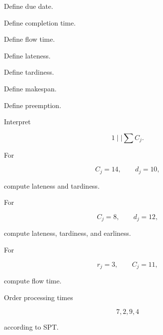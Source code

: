 \begin{exercise}[1]
Define due date.
\end{exercise}

\begin{exercise}[1]
Define completion time.
\end{exercise}

\begin{exercise}[1]
Define flow time.
\end{exercise}

\begin{exercise}[1]
Define lateness.
\end{exercise}

\begin{exercise}[1]
Define tardiness.
\end{exercise}

\begin{exercise}[1]
Define makespan.
\end{exercise}

\begin{exercise}[1]
Define preemption.
\end{exercise}

\begin{exercise}[1]
Interpret

\[
1\mid\mid\sum C_j.
\]
\end{exercise}

\begin{exercise}[2]
For

\[
C_j=14,
\qquad
d_j=10,
\]

compute lateness and tardiness.
\end{exercise}

\begin{exercise}[2]
For

\[
C_j=8,
\qquad
d_j=12,
\]

compute lateness, tardiness, and earliness.
\end{exercise}

\begin{exercise}[2]
For

\[
r_j=3,
\qquad
C_j=11,
\]

compute flow time.
\end{exercise}

\begin{exercise}[2]
Order processing times

\[
7,2,9,4
\]

according to SPT.
\end{exercise}

